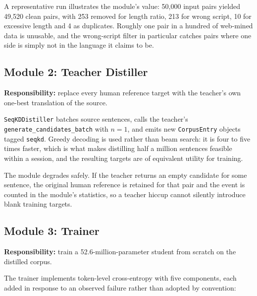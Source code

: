 A representative run illustrates the module's value: 50{,}000 input pairs
yielded 49{,}520 clean pairs, with 253 removed for length ratio, 213 for wrong
script, 10 for excessive length and 4 as duplicates. Roughly one pair in a
hundred of web-mined data is unusable, and the wrong-script filter in particular
catches pairs where one side is simply not in the language it claims to be.

\subsection{Module 2: Teacher Distiller}
\label{subsec:mod2}

\textbf{Responsibility:} replace every human reference target with the teacher's
own one-best translation of the source.

\texttt{SeqKDDistiller} batches source sentences, calls the teacher's
\texttt{generate\_candidates\_batch} with $n=1$, and emits new
\texttt{CorpusEntry} objects tagged \texttt{seqkd}. Greedy decoding is used
rather than beam search: it is four to five times faster, which is what makes
distilling half a million sentences feasible within a session, and the resulting
targets are of equivalent utility for training.

The module degrades safely. If the teacher returns an empty candidate for some
sentence, the original human reference is retained for that pair and the event
is counted in the module's statistics, so a teacher hiccup cannot silently
introduce blank training targets.

\subsection{Module 3: \seqkd{} Trainer}
\label{subsec:mod3}

\textbf{Responsibility:} train a 52.6-million-parameter student from scratch on
the distilled corpus.

The trainer implements token-level cross-entropy with five components, each
added in response to an observed failure rather than adopted by convention:

